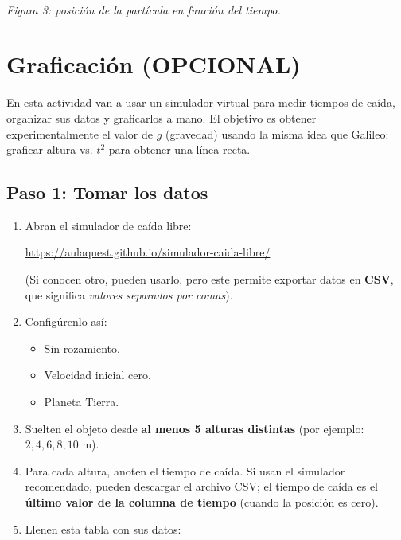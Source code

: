 \documentclass[11pt, letterpaper]{article}
\begin{document}
\begin{enumerate}[label=\arabic*., leftmargin=*, itemsep=8pt]
\begin{center}
\\
			\small\textit{Figura 3: posición de la partícula en función del tiempo.}
		\end{center}
		
	\end{enumerate}
	
	\section{Graficación (OPCIONAL)}
	
	En esta actividad van a usar un simulador virtual para medir tiempos de caída, organizar sus datos y graficarlos a mano. El objetivo es obtener experimentalmente el valor de $g$ (gravedad) usando la misma idea que Galileo: graficar altura vs. $t^2$ para obtener una línea recta.
	
	\subsection{Paso 1: Tomar los datos}
	
	\begin{enumerate}
		\item Abran el simulador de caída libre:
		
		\url{https://aulaquest.github.io/simulador-caida-libre/}
		
		(Si conocen otro, pueden usarlo, pero este permite exportar datos en \textbf{CSV}, que significa \emph{valores separados por comas}).
		
		\item Configúrenlo así:
		\begin{itemize}
			\item Sin rozamiento.
			\item Velocidad inicial cero.
			\item Planeta Tierra.
		\end{itemize}
		
		\item Suelten el objeto desde \textbf{al menos 5 alturas distintas} (por ejemplo: $2, 4, 6, 8, 10$ m).
		
		\item Para cada altura, anoten el tiempo de caída. Si usan el simulador recomendado, pueden descargar el archivo CSV; el tiempo de caída es el \textbf{último valor de la columna de tiempo} (cuando la posición es cero).
		
		\item Llenen esta tabla con sus datos:
	\end{enumerate}
	
\end{document}
